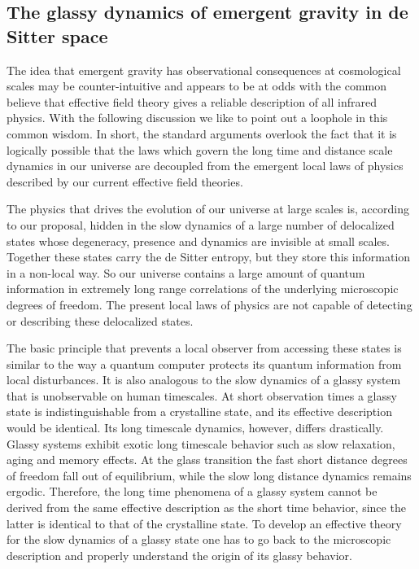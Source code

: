 \documentclass[a4paper,12pt]{article}
\begin{document}
\subsection{The glassy dynamics of emergent gravity in de Sitter space}
 
The idea that emergent gravity has observational consequences at cosmological scales may be counter-intuitive and appears to be at odds with the common believe that effective field theory gives a reliable description of all infrared physics.  With the following discussion we like to point out a loophole in this common wisdom. In short, the standard arguments overlook the fact that it is logically possible that the laws which govern the long time and distance scale dynamics in our universe are decoupled from the emergent local laws of physics described by our current effective field theories. 

 The physics that drives the evolution of our universe at large scales is, according to our proposal, hidden in the slow dynamics of a large number of delocalized states whose degeneracy, presence and dynamics are invisible at small scales. Together these states carry the de Sitter entropy, but they store this information in a non-local way. So our universe contains a large amount of quantum information in extremely long range correlations of the underlying microscopic degrees of freedom.   The present local laws of physics are not capable of detecting or describing these delocalized states. 

The basic principle that prevents a local observer from accessing these states is similar to the way a quantum computer protects its quantum information from local disturbances. It is also analogous to the slow dynamics of a glassy system that is unobservable on human timescales. At short observation times a glassy state is indistinguishable from a crystalline state, 
and its effective description would be identical. Its long timescale dynamics, however, differs 
drastically. Glassy systems exhibit exotic long timescale behavior such as slow 
relaxation, aging and memory effects. At the glass 
transition the fast short distance degrees of freedom fall out of equilibrium, 
while the slow long distance dynamics remains ergodic. Therefore, the long time phenomena of a glassy system cannot be derived from the same effective description as the short time behavior, since the latter is identical to that of the crystalline state.  To develop an effective theory for the slow dynamics of a glassy state one has to go back to the  microscopic description 
and properly understand the origin of its glassy behavior. 
\end{document}
